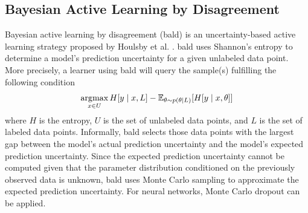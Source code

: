 \subsection{Bayesian Active Learning by Disagreement}
\label{sec:Related_work:Active_Learning:BALD}
Bayesian active learning by disagreement (\gls{bald}) is an uncertainty-based active learning strategy proposed by Houlsby et al. 
\cite{houlsby2011bayesian}. \gls{bald} uses Shannon's entropy \cite{cover1991information} to determine a model's prediction uncertainty for a given
unlabeled data point. More precisely, a learner using \gls{bald} will query the sample(s) fulfilling the following condition
\begin{equation}
    \operatorname*{\arg\!\max}_{x \in U} H[y \mid x, L] - \mathbb{E}_{\theta \sim p(\theta \mid L)} [H[y \mid x, \theta]]
\end{equation}
where $H$ is the entropy, $U$ is the set of unlabeled data points, and $L$ is the set of labeled data points.
Informally, \gls{bald} selects those data points with the largest gap between the model's actual prediction uncertainty and the model's expected
prediction uncertainty. Since the expected prediction uncertainty cannot be computed given that the parameter distribution conditioned on the
previously observed data is unknown, \gls{bald} uses Monte Carlo sampling to approximate the expected prediction uncertainty. For neural networks, Monte
Carlo dropout \cite{gal2016dropout} can be applied.

